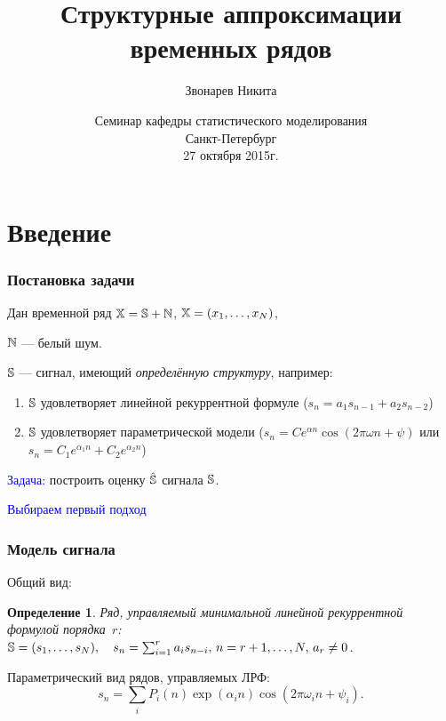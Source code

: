 \documentclass[unicode, notheorems]{beamer}
\title[Структурные аппроксимации временных рядов]{Структурные аппроксимации временных рядов}
\author[Звонарев Никита]{Звонарев Никита}
\institute[СПбГУ]{Санкт-Петербургский государственный университет \\
    Кафедра статистического моделирования
}
\date{
	Семинар кафедры статистического моделирования\\
    Санкт-Петербург\\
    27 октября 2015г.
}
\newtheorem{definition}{Определение}
\begin{document}
\begin{frame}
    \titlepage
\end{frame}


\section{Введение}
\begin{frame}
	\frametitle{Постановка задачи}
	Дан временной ряд $\mathbb{X} = \mathbb{S} + \mathbb{N}$, $\mathbb{X} = (x_1, \ldots, x_N)$, 
	
	$\mathbb{N}$ --- белый шум.

	$\mathbb{S}$ --- сигнал, имеющий \textit{определённую структуру}, например:
	\begin{enumerate}
		\item $\mathbb{S}$ удовлетворяет линейной рекуррентной формуле ($s_n = a_1 s_{n-1} + a_2 s_{n-2}$)
		\item $\mathbb{S}$ удовлетворяет параметрической модели ($s_n = C e^{\alpha n} \cos(2 \pi \omega n + \psi)$ или $s_n = C_1 e^{\alpha_1 n} + C_2 e^{\alpha_2 n}$)
	\end{enumerate}
	
	\textcolor{blue}{Задача:} построить оценку $\hat {\mathbb{S}}$ сигнала $\mathbb{S}$.
	
	\pause
	
	\textcolor{blue}{Выбираем первый подход}
\end{frame}

\begin{frame}
	\frametitle{Модель сигнала}
	Общий вид:
	
	\begin{definition}
		Ряд, управляемый минимальной линейной рекуррентной формулой порядка~$r$: $\mathbb{S} = (s_1, \ldots, s_N), \quad s_n = \sum_{i = 1}^{r} a_i s_{n-i}, \, n = r + 1, \ldots, N, \, a_r \ne 0$.
	\end{definition}
	
	\vspace{0.5cm}
	Параметрический вид рядов, управляемых ЛРФ:
	\begin{equation*}
	s_n = \sum_i P_i(n) \exp(\alpha_i n) \cos(2 \pi \omega_i n + \psi_i).
	\end{equation*}
	
\end{frame}
\end{document}
